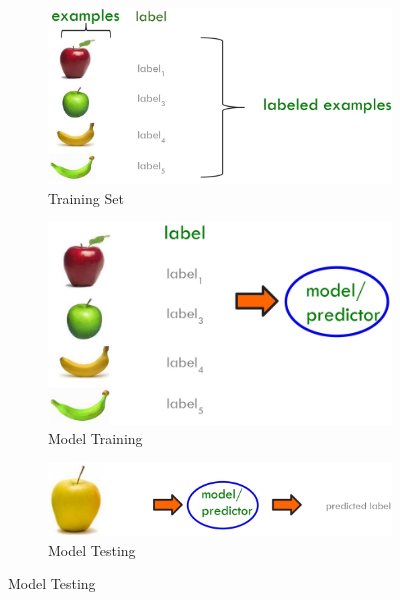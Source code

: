 \begin{figure}[h]
      \centering
      \begin{subfigure}{0.45\textwidth}
            \centering
            \includegraphics[width=\textwidth]{../img/Labeled_examples}
            \caption{Training Set}
      \end{subfigure}
      \hfill
      \begin{subfigure}{0.45\textwidth}
            \centering
            \includegraphics[width=\textwidth, height=0.55\textwidth]{../img/Supervised_training}
            \caption{Model Training}
      \end{subfigure}
      \hfill
      \begin{subfigure}{0.45\textwidth}
            \centering
            \includegraphics[width=\textwidth]{../img/Supervised_testing}
            \caption{Model Testing}
      \end{subfigure}
\end{figure}

